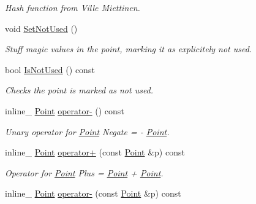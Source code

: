 \begin{DoxyCompactItemize}
\begin{DoxyCompactList}\small\item\em Hash function from Ville Miettinen. \end{DoxyCompactList}\item 
void \hyperlink{classPoint_aec2d7dcd03f7ba6ac7899704ac1983ba}{Set\+Not\+Used} ()\hypertarget{classPoint_aec2d7dcd03f7ba6ac7899704ac1983ba}{}\label{classPoint_aec2d7dcd03f7ba6ac7899704ac1983ba}

\begin{DoxyCompactList}\small\item\em Stuff magic values in the point, marking it as explicitely not used. \end{DoxyCompactList}\item 
bool \hyperlink{classPoint_aa0524356cffaf569928f0817b09a805d}{Is\+Not\+Used} () const \hypertarget{classPoint_aa0524356cffaf569928f0817b09a805d}{}\label{classPoint_aa0524356cffaf569928f0817b09a805d}

\begin{DoxyCompactList}\small\item\em Checks the point is marked as not used. \end{DoxyCompactList}\item 
inline\+\_\+ \hyperlink{classPoint}{Point} \hyperlink{classPoint_a315d9824eea49c0d240cb9591ee97024}{operator-\/} () const \hypertarget{classPoint_a315d9824eea49c0d240cb9591ee97024}{}\label{classPoint_a315d9824eea49c0d240cb9591ee97024}

\begin{DoxyCompactList}\small\item\em Unary operator for \hyperlink{classPoint}{Point} Negate = -\/ \hyperlink{classPoint}{Point}. \end{DoxyCompactList}\item 
inline\+\_\+ \hyperlink{classPoint}{Point} \hyperlink{classPoint_ae75aa36bd4be5dbcfe682a063927fbf1}{operator+} (const \hyperlink{classPoint}{Point} \&p) const \hypertarget{classPoint_ae75aa36bd4be5dbcfe682a063927fbf1}{}\label{classPoint_ae75aa36bd4be5dbcfe682a063927fbf1}

\begin{DoxyCompactList}\small\item\em Operator for \hyperlink{classPoint}{Point} Plus = \hyperlink{classPoint}{Point} + \hyperlink{classPoint}{Point}. \end{DoxyCompactList}\item 
inline\+\_\+ \hyperlink{classPoint}{Point} \hyperlink{classPoint_a0cfa198d4ba252ff0a5ea2e0ce5d3a2a}{operator-\/} (const \hyperlink{classPoint}{Point} \&p) const \hypertarget{classPoint_a0cfa198d4ba252ff0a5ea2e0ce5d3a2a}{}\label{classPoint_a0cfa198d4ba252ff0a5ea2e0ce5d3a2a}


\end{DoxyCompactItemize}

